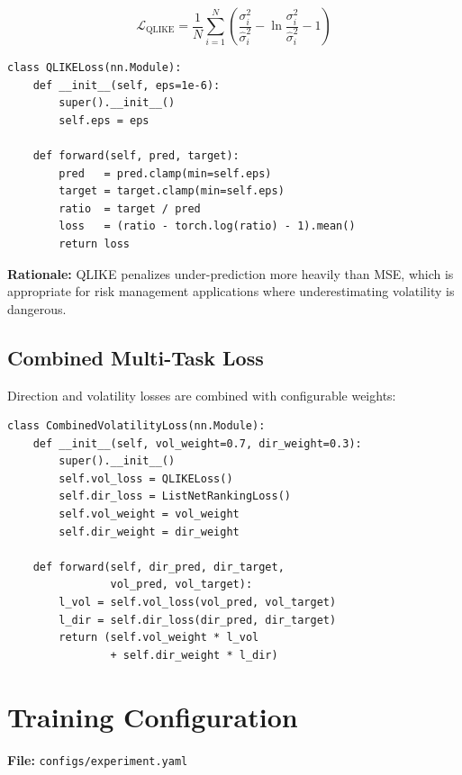 \documentclass[12pt, a4paper]{article}
\begin{document}
\begin{equation}
\mathcal{L}_{\text{QLIKE}} = \frac{1}{N}\sum_{i=1}^{N}\left(\frac{\sigma_i^2}{\hat{\sigma}_i^2} - \ln\frac{\sigma_i^2}{\hat{\sigma}_i^2} - 1\right)
\end{equation}

\begin{lstlisting}[caption={QLIKE loss}]
class QLIKELoss(nn.Module):
    def __init__(self, eps=1e-6):
        super().__init__()
        self.eps = eps
    
    def forward(self, pred, target):
        pred   = pred.clamp(min=self.eps)
        target = target.clamp(min=self.eps)
        ratio  = target / pred
        loss   = (ratio - torch.log(ratio) - 1).mean()
        return loss
\end{lstlisting}

\textbf{Rationale:}  QLIKE penalizes under-prediction more heavily than MSE, which is appropriate for risk management applications where underestimating volatility is dangerous.


\subsection{Combined Multi-Task Loss}

Direction and volatility losses are combined with configurable weights:

\begin{lstlisting}[caption={Combined loss}]
class CombinedVolatilityLoss(nn.Module):
    def __init__(self, vol_weight=0.7, dir_weight=0.3):
        super().__init__()
        self.vol_loss = QLIKELoss()
        self.dir_loss = ListNetRankingLoss()
        self.vol_weight = vol_weight
        self.dir_weight = dir_weight
    
    def forward(self, dir_pred, dir_target,
                vol_pred, vol_target):
        l_vol = self.vol_loss(vol_pred, vol_target)
        l_dir = self.dir_loss(dir_pred, dir_target)
        return (self.vol_weight * l_vol
                + self.dir_weight * l_dir)
\end{lstlisting}


\section{Training Configuration}

\noindent\textbf{File:} \texttt{configs/experiment.yaml}
\end{document}
